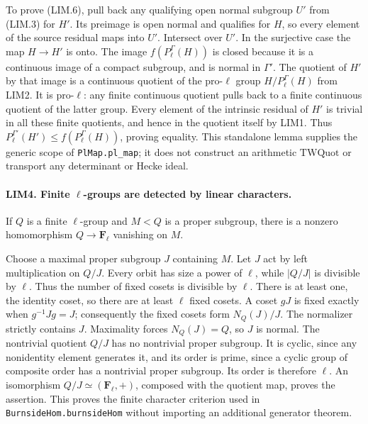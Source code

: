 To prove (LIM.6), pull back any qualifying open normal subgroup \(U'\)
from (LIM.3) for \(H'\).  Its preimage is open normal and qualifies
for \(H\), so every element of the source residual maps into \(U'\).
Intersect over \(U'\).  In the surjective case the map
\(H\to H'\) is onto.  The image \(f(P_\ell^\Gamma(H))\) is closed
because it is a continuous image of a compact subgroup, and is normal
in \(\Gamma'\).  The quotient of \(H'\) by that image is a continuous
quotient of the pro-\(\ell\) group \(H/P_\ell^\Gamma(H)\) from LIM2.
It is pro-\(\ell\): any finite continuous quotient pulls back to a
finite continuous quotient of the latter group.
Every element of the intrinsic residual of \(H'\) is trivial in all
these finite quotients, and hence in the quotient itself by LIM1.
Thus \(P_\ell^{\Gamma'}(H')\le f(P_\ell^\Gamma(H))\), proving equality.
This standalone lemma supplies the generic scope of
\texttt{PlMap.pl\_map}; it does not construct an arithmetic
\(\mathrm{TWQuot}\) or transport any determinant or Hecke ideal.

\paragraph{LIM4. Finite \(\ell\)-groups are detected by linear characters.}
\label{claim:LIM4}
If \(Q\) is a finite \(\ell\)-group and \(M<Q\) is a proper subgroup,
there is a nonzero homomorphism \(Q\to\mathbf F_\ell\) vanishing on
\(M\).

Choose a maximal proper subgroup \(J\) containing \(M\).  Let \(J\)
act by left multiplication on \(Q/J\).  Every orbit has size a power
of \(\ell\), while \(|Q/J|\) is divisible by \(\ell\).
Thus the number of fixed cosets is divisible by \(\ell\).
There is at least one, the identity coset, so there are at least
\(\ell\) fixed cosets.  A coset \(gJ\) is fixed exactly when
\(g^{-1}Jg=J\); consequently the fixed cosets form \(N_Q(J)/J\).
The normalizer strictly contains \(J\).  Maximality forces
\(N_Q(J)=Q\), so \(J\) is normal.
The nontrivial quotient \(Q/J\) has no nontrivial proper subgroup.
It is cyclic, since any nonidentity element generates it, and its
order is prime, since a cyclic group of composite order has a
nontrivial proper subgroup.  Its order is therefore \(\ell\).
An isomorphism \(Q/J\simeq(\mathbf F_\ell,+)\), composed with the
quotient map, proves the assertion.  This proves the finite character
criterion used in \texttt{BurnsideHom.burnsideHom} without importing
an additional generator theorem.

